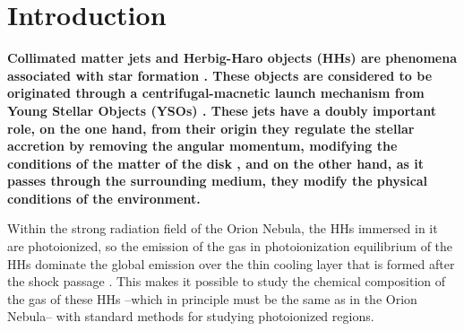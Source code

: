 \documentclass[twocolumn,linenumbers]{aastex63}
\begin{document}





\section{Introduction}
\label{sec:introduction}

{\bf Collimated matter jets and Herbig-Haro objects (HHs) are phenomena associated with star formation \citep[see ][and references therein]{Mundt83,Hartigan89,Reipurth01,Nisini2005}. These objects are considered to be originated through a centrifugal-macnetic launch mechanism from Young Stellar Objects (YSOs) \citep[see ][and references therein]{Schwartz83,Strom83,Nisini2018}. These jets have a doubly important role, on the one hand, from their origin they regulate the stellar accretion by removing the angular momentum, modifying the conditions of the matter of the disk \citep[see ][and references therein]{Hartigan94, Giannini2013, Giannini2015}, and on the other hand, as it passes through the surrounding medium, they modify the physical conditions of the environment. 

Within the strong radiation field of the Orion Nebula, the HHs immersed in it are photoionized, so the emission of the gas in photoionization equilibrium of the HHs dominate the global emission over the thin cooling layer that is formed after the shock passage \citep{henney02}. This makes it possible to study the chemical composition of the gas of these HHs --which in principle must  be the same as in the Orion Nebula-- with standard methods for studying photoionized regions.}
\end{document}
